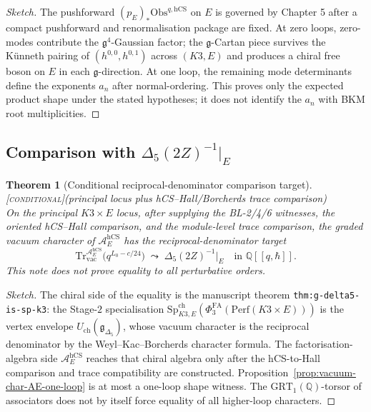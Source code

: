 \documentclass[11pt]{amsart}
\providecommand{\Q}{\mathbb{Q}}
\providecommand{\Perf}{\mathrm{Perf}}
\providecommand{\cA}{\mathcal{A}}
\providecommand{\frakg}{\mathfrak{g}}
\providecommand{\Tr}{\mathrm{Tr}}
\providecommand{\Obs}{\mathrm{Obs}}
\providecommand{\hCS}{\mathrm{hCS}}
\providecommand{\Gdelta}{\mathfrak{g}_{\Delta_{5}}}
\providecommand{\PhiFA}{\Phi^{\mathrm{FA}}}
\providecommand{\SpCh}{\mathrm{Sp}^{\mathrm{ch}}}
\providecommand{\ClaimStatusConditional}{\textsc{[conditional]}}
\theoremstyle{plain}
\newtheorem{theorem}{Theorem}[section]
\theoremstyle{definition}
\theoremstyle{remark}
\begin{document}
\begin{proof}[Sketch]
The pushforward $(p_{E})_{\ast}\Obs^{q,\hCS}$ on $E$ is governed by
\cite{CostelloGwilliam2017} Chapter 5 after a compact pushforward and
renormalisation package are fixed. At zero loops, zero-modes contribute
the $\frakg^{4}$-Gaussian factor; the
$\frakg$-Cartan piece survives the K\"unneth pairing of
$(h^{0,0},h^{0,1})$ across $(K3,E)$ and produces a chiral free boson
on $E$ in each $\frakg$-direction. At one loop, the remaining mode
determinants define the exponents $a_n$ after normal-ordering. This
proves only the expected product shape under the stated hypotheses; it
does not identify the $a_n$ with BKM root multiplicities.
\end{proof}

\subsection{Comparison with $\Delta_{5}(2Z)^{-1}|_{E}$}
\label{subsec:compare-delta5-side}

\begin{theorem}[Conditional reciprocal-denominator comparison target]
\label{thm:perturbative-match-delta5}
\ClaimStatusConditional{}\textup{(}principal locus plus
hCS--Hall/Borcherds trace comparison\textup{)}\\
On the principal $K3\times E$ locus, after supplying the BL-2/4/6
witnesses, the oriented hCS--Hall comparison, and the module-level
trace comparison, the graded vacuum character of $\cA_{E}^{\hCS}$ has
the reciprocal-denominator target
\[
\Tr_{\mathrm{vac}}^{\cA_{E}^{\hCS}}\bigl(q^{L_{0}-c/24}\bigr)
\;\leadsto\;
\Delta_{5}(2Z)^{-1}\big|_{E}
\quad\text{in }\Q[\![q,\hbar]\!].
\]
This note does not prove equality to all perturbative orders.
\end{theorem}

\begin{proof}[Sketch]
The chiral side of the equality is the manuscript theorem
\texttt{thm:g-delta5-is-sp-k3}: the Stage-$2$ specialisation
$\SpCh_{K3,E}(\PhiFA_{3}(\Perf(K3\times E)))$ is the vertex envelope
$U_{\mathrm{ch}}(\Gdelta)$, whose vacuum character is the reciprocal
denominator by the Weyl--Kac--Borcherds character formula. The
factorisation-algebra side $\cA_{E}^{\hCS}$ reaches that chiral algebra
only after the hCS-to-Hall comparison and trace compatibility are
constructed. Proposition~\ref{prop:vacuum-char-AE-one-loop} is at most
a one-loop shape witness. The $\mathrm{GRT}_{1}(\Q)$-torsor of
associators does not by itself force equality of all higher-loop
characters.
\end{proof}
\end{document}

